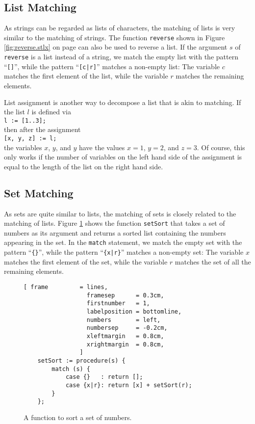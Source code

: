 \subsection{List Matching}
As strings can be regarded as lists of characters, the matching of lists is very similar to the matching of
strings.  The function \texttt{reverse} shown in Figure \ref{fig:reverse.stlx} on page
\pageref{fig:reverse.stlx} can also be used to reverse a list.
 If the argument $s$ of \texttt{reverse} is a list instead of a string, we match the empty list with
 the pattern ``\texttt{[]}'', while the pattern ``\texttt{[c|r]}'' matches a non-empty list:  
The variable $c$  matches the first element  of the list, while the variable $r$ matches the remaining elements.

List assignment is another way to decompose a list that is akin to matching.  If the list 
$l$ is defined via
\\[0.2cm]
\hspace*{1.3cm}
\texttt{l := [1..3];}
\\[0.2cm]
then after the assignment
\\[0.2cm]
\hspace*{1.3cm}
\texttt{[x, y, z] := l;}
\\[0.2cm]
the variables $x$, $y$, and $y$ have the values $x = 1$, $y = 2$, and $z = 3$.  Of course, this only
works if the number of variables on the left hand side of the assignment is equal to the length of
the list on the right hand side.

\subsection{Set Matching}
As sets are quite similar to lists, the matching of sets is closely related to the matching of
lists.  Figure \ref{fig:set-sort.stlx}  shows the function \texttt{setSort} that takes a
set of numbers as its  argument and returns a sorted list containing the numbers appearing
in the set.  In the \texttt{match} statement, we match the empty set with the pattern
``\texttt{\{\}}'', while the pattern ``\texttt{\{x|r\}}'' matches a non-empty set:  
The variable $x$ matches the first element of the set, while the variable $r$ matches the
set of all the remaining elements.  


\begin{figure}[!ht]
\centering
\begin{Verbatim}[ frame         = lines, 
                  framesep      = 0.3cm, 
                  firstnumber   = 1,
                  labelposition = bottomline,
                  numbers       = left,
                  numbersep     = -0.2cm,
                  xleftmargin   = 0.8cm,
                  xrightmargin  = 0.8cm,
                ]
    setSort := procedure(s) {
        match (s) {
            case {}   : return [];
            case {x|r}: return [x] + setSort(r);
        }
    };
\end{Verbatim}
\vspace*{-0.3cm}
\caption{A function to sort a set of numbers.}
\label{fig:set-sort.stlx}
\end{figure}

